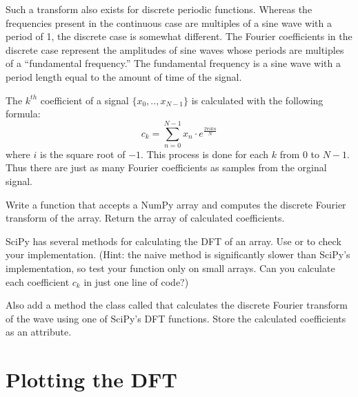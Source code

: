 Such a transform also exists for discrete periodic functions.
Whereas the frequencies present in the continuous case are multiples of a sine wave with a period of 1, the discrete case is somewhat different.
The Fourier coefficients in the discrete case represent the amplitudes of sine waves whose periods are multiples of a ``fundamental frequency.''
The fundamental frequency is a sine wave with a period length equal to the amount of time of the signal.

The $k^{th}$ coefficient of a signal $\{x_0, .., x_{N-1}\}$ is calculated with the following formula:
\[
c_k = \displaystyle{\sum_{n=0}^{N-1}} x_n \cdot e^{\frac{2\pi ikn}{N}}
\]
where $i$ is the square root of $-1$.
This process is done for each $k$ from $0$ to $N-1$.
Thus there are just as many Fourier coefficients as samples from the orginal signal.

\begin{problem}
Write a function that accepts a NumPy array and computes the discrete Fourier transform of the array.
Return the array of calculated coefficients.

SciPy has several methods for calculating the DFT of an array.
Use  or  to check your implementation.
(Hint: the naive method is significantly slower than SciPy's implementation, so test your function only on small arrays. Can you calculate each coefficient $c_k$ in just one line of code?)

Also add a method the  class called  that calculates the discrete Fourier transform of the wave using one of SciPy's DFT functions.
Store the calculated coefficients as an attribute.
\end{problem}



\section*{Plotting the DFT}

